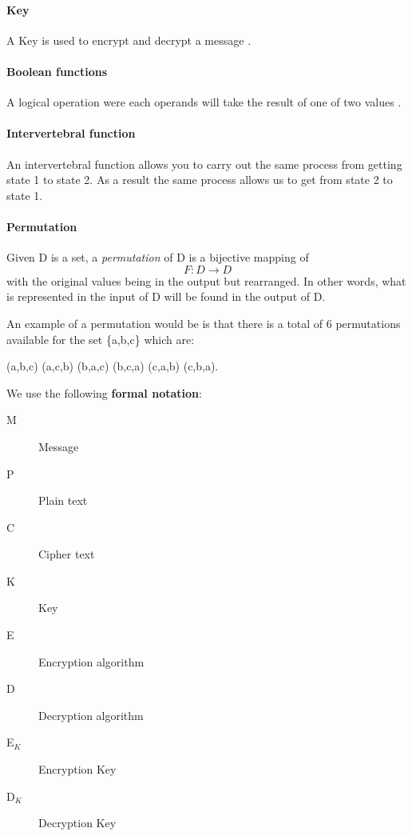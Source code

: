 \documentclass[11pt,a4paper]{report}
\begin{document}
\paragraph{Key}
A Key is used to encrypt and decrypt a message \cite{Berti2003CISSP}.

\paragraph{Boolean functions}
A logical operation were each operands will take the result of one of two values \cite{Gregory2013Cryptanalysis}.

\paragraph{Intervertebral function}
An intervertebral function allows you to carry out the
same process from getting state 1 to state 2. As a result the same process
allows us to get from state 2 to state 1.

\paragraph{Permutation}
Given D is a set, a \emph{permutation} of D is a bijective mapping of
\begin{displaymath}
F: D \rightarrow D
\end{displaymath}
with the original values being in the output but rearranged. In other words, what is represented in the input of D will be found in the output of D.

An example of a permutation would be is that there is a total of 6 permutations available for the set \{a,b,c\} which are:
\begin{center}
(a,b,c) (a,c,b) (b,a,c) (b,c,a) (c,a,b) (c,b,a).
\end{center}


We use the following \textbf{formal notation}:
\begin{description}
\item[M] Message
\item[P] Plain text
\item[C] Cipher text
\item[K] Key
\item[E] Encryption algorithm
\item[D] Decryption algorithm
\item[E$_{K}$] Encryption Key
\item[D$_{K}$] Decryption Key
\end{description}
\end{document}
